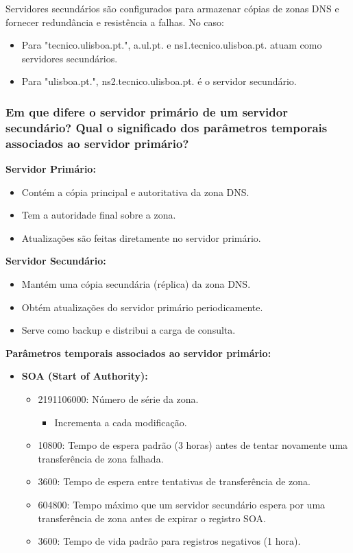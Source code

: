 Servidores secundários são configurados para armazenar cópias de 
zonas DNS e fornecer redundância e resistência a falhas. No caso:

\begin{itemize}
    \item Para "tecnico.ulisboa.pt.", a.ul.pt. e ns1.tecnico.ulisboa.pt. atuam como servidores secundários.
    \item Para "ulisboa.pt.", ns2.tecnico.ulisboa.pt. é o servidor secundário.
\end{itemize}

\subsubsection{Em que difere o servidor primário de um servidor secundário? Qual o significado dos parâmetros
temporais associados ao servidor primário?}

\textbf{Servidor Primário:}
\begin{itemize}
    \item Contém a cópia principal e autoritativa da zona DNS.
    \item Tem a autoridade final sobre a zona.
    \item Atualizações são feitas diretamente no servidor primário.
\end{itemize}


\textbf{Servidor Secundário:}
\begin{itemize}
    \item Mantém uma cópia secundária (réplica) da zona DNS.
    \item Obtém atualizações do servidor primário periodicamente.
    \item Serve como backup e distribui a carga de consulta.
\end{itemize}

\textbf{Parâmetros temporais associados ao servidor primário:}
\begin{itemize}
    \item \textbf{SOA (Start of Authority):}
        \begin{itemize}
            \item 2191106000: Número de série da zona.
            \begin{itemize}
                \item Incrementa a cada modificação.
            \end{itemize}
            \item 10800: Tempo de espera padrão (3 horas) antes de tentar novamente uma transferência de zona falhada.
            \item 3600: Tempo de espera entre tentativas de transferência de zona.
            \item 604800: Tempo máximo que um servidor secundário espera por uma transferência de zona antes de expirar o registro SOA.
            \item 3600: Tempo de vida padrão para registros negativos (1 hora).
        \end{itemize}
\end{itemize}
